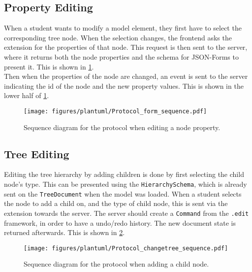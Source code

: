 \subsection{Property Editing}

When a student wants to modify a model element, they first have to select the corresponding tree node.
When the selection changes, the frontend asks the extension for the properties of that node.
This request is then sent to the server, where it returns both the node properties and the schema for JSON-Forms to present it.
This is shown in \cref{fig:protocol-form}.\\

Then when the properties of the node are changed, an event is sent to the server indicating the id of the node and the new property values.
This is shown in the lower half of \cref{fig:protocol-form}.

\begin{figure}[htbp]  %
  \centering
  \texttt{[image: figures/plantuml/Protocol\_form\_sequence.pdf]}
  \caption[Protocol Sequence Diagram of Property Form]{Sequence diagram for the protocol when editing a node property. \bluearrowDesc}\label{fig:protocol-form}
\end{figure}

\FloatBarrier

\subsection{Tree Editing}

Editing the tree hierarchy by adding children is done by first selecting the child node's type.
This can be presented using the \texttt{HierarchySchema}, which is already sent on the \texttt{TreeDocument} when the model was loaded.
When a student selects the node to add a child on, and the type of child node, this is sent via the extension towards the server.
The server should create a \texttt{Command} from the \texttt{.edit} framework, in order to have a undo/redo history.
The new document state is returned afterwards.
This is shown in \cref{fig:protocol-changetree}.

\begin{figure}[htbp]  %
  \centering
  \texttt{[image: figures/plantuml/Protocol\_changetree\_sequence.pdf]}
  \caption[Protocol Sequence Diagram of Tree Changes]{Sequence diagram for the protocol when adding a child node. \bluearrowDesc}\label{fig:protocol-changetree}
\end{figure}


\FloatBarrier
